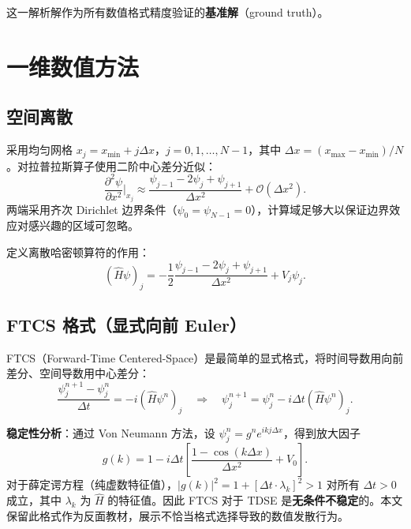 \documentclass[12pt,a4paper]{article}
\begin{document}
这一解析解作为所有数值格式精度验证的\textbf{基准解}（ground truth）。

\section{一维数值方法}

\subsection{空间离散}

采用均匀网格 $x_j = x_{\min} + j\Delta x$，$j = 0, 1, \ldots, N-1$，其中 $\Delta x = (x_{\max} - x_{\min})/N$。对拉普拉斯算子使用二阶中心差分近似：
\begin{equation}
    \frac{\partial^2 \psi}{\partial x^2}\bigg|_{x_j}
    \approx \frac{\psi_{j-1} - 2\psi_j + \psi_{j+1}}{\Delta x^2} + \mathcal{O}(\Delta x^2).
\end{equation}
两端采用齐次 Dirichlet 边界条件（$\psi_0 = \psi_{N-1} = 0$），计算域足够大以保证边界效应对感兴趣的区域可忽略。

定义离散哈密顿算符的作用：
\begin{equation}
    (\hat{H}\psi)_j = -\frac{1}{2}\frac{\psi_{j-1} - 2\psi_j + \psi_{j+1}}{\Delta x^2} + V_j \psi_j.
\end{equation}

\subsection{FTCS 格式（显式向前 Euler）}

FTCS（Forward-Time Centered-Space）是最简单的显式格式，将时间导数用向前差分、空间导数用中心差分：
\begin{equation}
    \frac{\psi_j^{n+1} - \psi_j^n}{\Delta t} = -i (\hat{H}\psi^n)_j
    \quad\Longrightarrow\quad
    \psi_j^{n+1} = \psi_j^n - i\Delta t (\hat{H}\psi^n)_j.
\end{equation}

\textbf{稳定性分析}：通过 Von Neumann 方法，设 $\psi_j^n = g^n e^{ikj\Delta x}$，得到放大因子
\begin{equation}
    g(k) = 1 - i\Delta t\left[\frac{1-\cos(k\Delta x)}{\Delta x^2} + V_0\right].
\end{equation}
对于薛定谔方程（纯虚数特征值），$|g(k)|^2 = 1 + [\Delta t \cdot \lambda_k]^2 > 1$ 对所有 $\Delta t > 0$ 成立，其中 $\lambda_k$ 为 $\hat{H}$ 的特征值。因此 FTCS 对于 TDSE 是\textbf{无条件不稳定}的。本文保留此格式作为反面教材，展示不恰当格式选择导致的数值发散行为。
\end{document}
